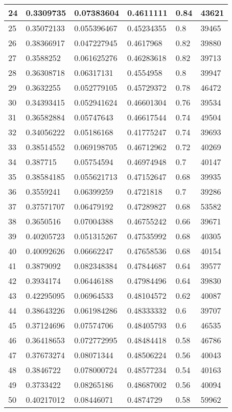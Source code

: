 \begin{longtable}{|l|l|l|l|l|l|}
24 & 0.3309735 & 0.07383604 & 0.4611111 & 0.84 & 43621 \\ \hline 
25 & 0.35072133 & 0.055396467 & 0.45234355 & 0.8 & 39465 \\ \hline 
26 & 0.38366917 & 0.047227945 & 0.4617968 & 0.82 & 39880 \\ \hline 
27 & 0.3588252 & 0.061625276 & 0.46283618 & 0.82 & 39713 \\ \hline 
28 & 0.36308718 & 0.06317131 & 0.4554958 & 0.8 & 39947 \\ \hline 
29 & 0.3632255 & 0.052779105 & 0.45729372 & 0.78 & 46472 \\ \hline 
30 & 0.34393415 & 0.052941624 & 0.46601304 & 0.76 & 39534 \\ \hline 
31 & 0.36582884 & 0.05747643 & 0.46617544 & 0.74 & 49504 \\ \hline 
32 & 0.34056222 & 0.05186168 & 0.41775247 & 0.74 & 39693 \\ \hline 
33 & 0.38514552 & 0.069198705 & 0.46712962 & 0.72 & 40269 \\ \hline 
34 & 0.387715 & 0.05754594 & 0.46974948 & 0.7 & 40147 \\ \hline 
35 & 0.38584185 & 0.055621713 & 0.47152647 & 0.68 & 39935 \\ \hline 
36 & 0.3559241 & 0.06399259 & 0.4721818 & 0.7 & 39286 \\ \hline 
37 & 0.37571707 & 0.06479192 & 0.47289827 & 0.68 & 53582 \\ \hline 
38 & 0.3650516 & 0.07004388 & 0.46755242 & 0.66 & 39671 \\ \hline 
39 & 0.40205723 & 0.051315267 & 0.47535992 & 0.68 & 40305 \\ \hline 
40 & 0.40092626 & 0.06662247 & 0.47658536 & 0.68 & 40154 \\ \hline 
41 & 0.3879092 & 0.082348384 & 0.47844687 & 0.64 & 39577 \\ \hline 
42 & 0.3934174 & 0.06446188 & 0.47984496 & 0.64 & 39830 \\ \hline 
43 & 0.42295095 & 0.06964533 & 0.48104572 & 0.62 & 40087 \\ \hline 
44 & 0.38643226 & 0.061984286 & 0.48333332 & 0.6 & 39707 \\ \hline 
45 & 0.37124696 & 0.07574706 & 0.48405793 & 0.6 & 46535 \\ \hline 
46 & 0.36418653 & 0.072772995 & 0.48484418 & 0.58 & 46786 \\ \hline 
47 & 0.37673274 & 0.08071344 & 0.48506224 & 0.56 & 40043 \\ \hline 
48 & 0.3846722 & 0.078000724 & 0.48577234 & 0.54 & 40163 \\ \hline 
49 & 0.3733422 & 0.08265186 & 0.48687002 & 0.56 & 40094 \\ \hline 
50 & 0.40217012 & 0.08446071 & 0.4874729 & 0.58 & 59962 \\ \hline 
\end{longtable}
